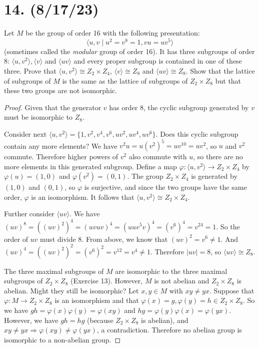 \documentclass{article}
\begin{document}
\section*{14. (8/17/23)}

Let $M$ be the group of order 16 with the following presentation:
\begin{equation*}
    \langle u, v \mid u^2 = v^8 = 1, vu = uv^5 \rangle
\end{equation*}
(sometimes called the \emph{modular} group of order 16). It has three subgroups of order 8: $\langle u, v^2 \rangle, \langle v \rangle$ and $\langle uv \rangle$ and every proper subgroup is contained in one of these three. Prove that $\langle u, v^2 \rangle \cong Z_2 \times Z_4$, $\langle v \rangle \cong Z_8$ and $\langle uv \rangle \cong Z_8$. Show that the lattice of subgroups of $M$ is the same as the lattice of subgroups of $Z_2 \times Z_8$ but that these two groups are not isomorphic.

\begin{proof}
    Given that the generator $v$ has order 8, the cyclic subgroup generated by $v$ must be isomorphic to $Z_8$.

    Consider next $\langle u, v^2 \rangle = \{ 1, v^2, v^4, v^6, uv^2, uv^4, uv^6 \}$. Does this cyclic subgroup contain any more elements? We have $v^2 u = u(v^2)^5 = uv^{10} = uv^2$, so $u$ and $v^2$ commute. Therefore higher powers of $v^2$ also commute with $u$, so there are no more elements in this generated subgroup. Define a map $\varphi: \langle u, v^2 \rangle \rightarrow Z_2 \times Z_4$ by $\varphi(u) = (1, 0)$ and $\varphi(v^2) = (0, 1)$. The group $Z_2 \times Z_4$ is generated by $(1, 0)$ and $(0, 1)$, so $\varphi$ is surjective, and since the two groups have the same order, $\varphi$ is an isomorphism. It follows that $\langle u, v^2 \rangle \cong Z_2 \times Z_4$.

    Further consider $\langle uv \rangle$. We have $(uv)^8 = ((uv)^2)^4 = (uvuv)^4 = (uuv^5 v)^4 = (v^6)^4 = v^{24} = 1$. So the order of $uv$ must divide 8. From above, we know that $(uv)^2 = v^6 \neq 1$. And $(uv)^4 = ((uv)^2)^2 = (v^6)^2 = v^{12} = v^4 \neq 1$. Therefore $|uv| = 8$, so $\langle uv \rangle \cong Z_8$.

    The three maximal subgroups of $M$ are isomorphic to the three maximal subgroups of $Z_2 \times Z_8$ (Exercise 13). However, $M$ is not abelian and $Z_2 \times Z_8$ is abelian. Might they still be isomorphic? Let $x, y \in M$ with $xy \neq yx$. Suppose that $\varphi: M \rightarrow Z_2 \times Z_8$ is an isomorphism and that $\varphi(x) = g, \varphi(y) = h \in Z_2 \times Z_8$. So we have $gh = \varphi(x) \varphi(y) = \varphi(xy)$ and $hg = \varphi(y) \varphi(x) = \varphi(yx)$. However, we have $gh = hg$ (because $Z_2 \times Z_8$ is abelian), and $xy \neq yx \Rightarrow \varphi(xy) \neq \varphi(yx)$, a contradiction. Therefore no abelian group is isomorphic to a non-abelian group.
\end{proof}
\end{document}
